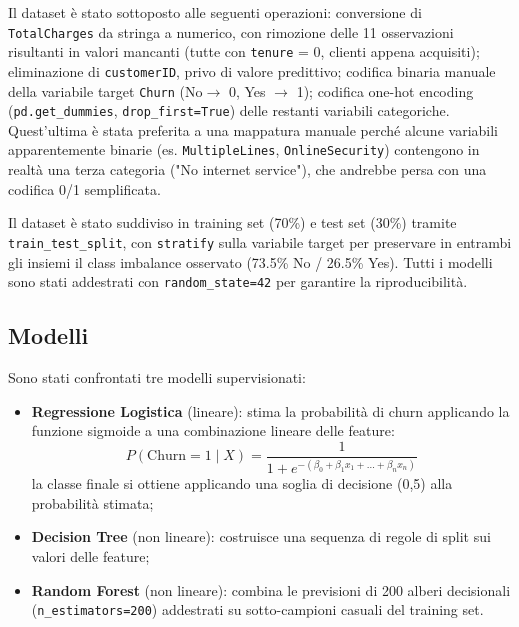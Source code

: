 \documentclass[11pt]{article}
\begin{document}
Il dataset è stato sottoposto alle seguenti operazioni: conversione di
\texttt{TotalCharges} da stringa a numerico, con rimozione delle 11 osservazioni risultanti in valori mancanti (tutte con \texttt{tenure} = 0, clienti appena acquisiti); eliminazione di \texttt{customerID}, privo di valore predittivo; codifica binaria manuale della variabile target \texttt{Churn} (No$\rightarrow$ 0, Yes $\rightarrow$ 1); codifica one-hot encoding (\texttt{pd.get\_dummies}, \texttt{drop\_first=True}) delle restanti variabili categoriche. Quest'ultima è stata preferita a una mappatura manuale perché alcune variabili apparentemente binarie (es. \texttt{MultipleLines}, \texttt{OnlineSecurity}) contengono in realtà una terza categoria ("No internet service"), che andrebbe persa con una codifica 0/1 semplificata.

Il dataset è stato suddiviso in training set (70\%) e test set (30\%) tramite \texttt{train\_test\_split}, con \texttt{stratify} sulla variabile target per preservare in entrambi gli insiemi il class imbalance osservato (73.5\% No / 26.5\% Yes). Tutti i modelli sono stati addestrati con \texttt{random\_state=42} per garantire la riproducibilità.

\subsection{Modelli}

Sono stati confrontati tre modelli supervisionati:

\begin{itemize}
    \item \textbf{Regressione Logistica} (lineare): stima la probabilità di
    churn applicando la funzione sigmoide a una combinazione lineare delle
    feature:
    \begin{equation}
        P(\text{Churn}=1 \mid X) = \frac{1}{1 + e^{-(\beta_0 + \beta_1 x_1 + \dots + \beta_n x_n)}}
        \label{eq:sigmoide}
    \end{equation}
    la classe finale si ottiene applicando una soglia di decisione (0,5) alla probabilità stimata;
    \item \textbf{Decision Tree} (non lineare): costruisce una sequenza di
    regole di split sui valori delle feature;
    \item \textbf{Random Forest} (non lineare): combina le previsioni di 200
    alberi decisionali (\texttt{n\_estimators=200}) addestrati su
    sotto-campioni casuali del training set.
\end{itemize}
\end{document}
